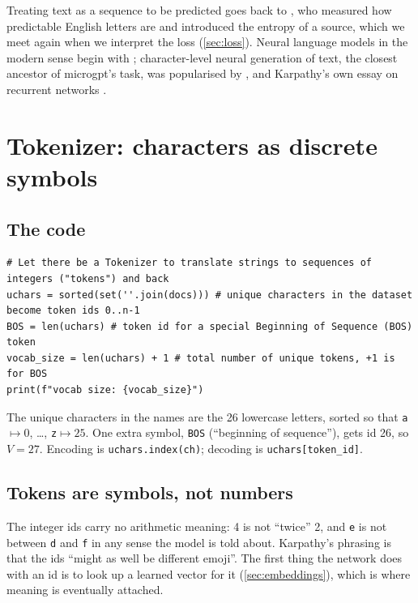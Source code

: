 \documentclass[11pt,letterpaper]{article}
\theoremstyle{remark}
\newcommand{\code}[1]{\lstinline[basicstyle=\ttfamily\small]|#1|}
\newcommand{\BOS}{\texttt{BOS}}
\begin{document}
Treating text as a sequence to be predicted goes back to \textcite{shannon1948mathematical,shannon1951prediction}, who measured how predictable English letters are and introduced the entropy of a source, which we meet again when we interpret the loss (\cref{sec:loss}). Neural language models in the modern sense begin with \textcite{bengio2003neural}; character-level neural generation of text, the closest ancestor of microgpt's task, was popularised by \textcite{sutskever2011generating}, \textcite{graves2013generating} and Karpathy's own essay on recurrent networks \parencite{karpathy2015rnn}.

\section{Tokenizer: characters as discrete symbols}

\subsection{The code}

\begin{lstlisting}
# Let there be a Tokenizer to translate strings to sequences of integers ("tokens") and back
uchars = sorted(set(''.join(docs))) # unique characters in the dataset become token ids 0..n-1
BOS = len(uchars) # token id for a special Beginning of Sequence (BOS) token
vocab_size = len(uchars) + 1 # total number of unique tokens, +1 is for BOS
print(f"vocab size: {vocab_size}")
\end{lstlisting}

The unique characters in the names are the 26 lowercase letters, sorted so that \texttt{a}$\mapsto 0$, \dots, \texttt{z}$\mapsto 25$. One extra symbol, \BOS{} (``beginning of sequence''), gets id 26, so $V = 27$. Encoding is \code{uchars.index(ch)}; decoding is \code{uchars[token_id]}.

\subsection{Tokens are symbols, not numbers}

The integer ids carry no arithmetic meaning: 4 is not ``twice'' 2, and \texttt{e} is not between \texttt{d} and \texttt{f} in any sense the model is told about. Karpathy's phrasing is that the ids ``might as well be different emoji''. The first thing the network does with an id is to look up a learned vector for it (\cref{sec:embeddings}), which is where meaning is eventually attached.
\end{document}
